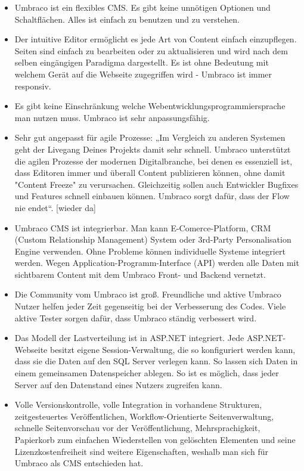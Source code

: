 \begin{itemize}	
	\item Umbraco ist ein flexibles CMS. Es gibt keine unnötigen Optionen und Schaltflächen. Alles ist einfach zu benutzen und zu verstehen.
	\item Der intuitive Editor ermöglicht es jede Art von Content einfach einzupflegen. Seiten sind einfach zu bearbeiten oder zu aktualisieren und wird  nach dem selben eingängigen Paradigma dargestellt. Es ist ohne Bedeutung mit welchem Gerät auf die Webseite zugegriffen wird - Umbraco ist immer responsiv. 
	\item Es gibt keine Einschränkung welche Webentwicklungsprogrammiersprache man nutzen muss. Umbraco ist sehr anpassungsfähig. 
	\item Sehr gut angepasst für agile Prozesse: „Im Vergleich zu anderen Systemen geht der Livegang Deines Projekts damit sehr schnell. Umbraco unterstützt die agilen Prozesse der modernen Digitalbranche, bei denen es essenziell ist, dass Editoren immer und überall Content publizieren können, ohne damit "Content Freeze" zu verursachen. Gleichzeitig sollen auch Entwickler Bugfixes und Features schnell einbauen können. Umbraco sorgt dafür, dass der Flow nie endet“. [wieder da] \cite{UmracoHQ2018}
	\item Umbraco CMS ist integrierbar. Man kann E-Comerce-Platform, CRM (Custom Relationship Management) System oder 3rd-Party Personalisation Engine verwenden. Ohne Probleme können individuelle Systeme integriert werden. Wegen Application-Programm-Interface (API) werden alle Daten mit sichtbarem Content mit dem Umbraco Front- und Backend vernetzt.
	\item Die Community vom Umbraco ist groß. Freundliche und aktive Umbraco Nutzer helfen jeder Zeit  gegenseitig bei der Verbesserung des Codes. Viele aktive Tester sorgen dafür, dass Umbraco ständig verbessert wird.
	\item Das Modell der Lastverteilung ist in ASP.NET integriert. Jede ASP.NET-Webseite besitzt eigene Session-Verwaltung, die so konfiguriert werden kann, dass sie die Daten auf den SQL Server verlegen kann. So lassen sich Daten in einem gemeinsamen Datenspeicher ablegen. So ist es möglich, dass jeder Server auf den Datenstand eines Nutzers zugreifen kann.
	\item Volle Versionskontrolle, volle Integration in vorhandene Strukturen, zeitgesteuertes Veröffentlichen, Workflow-Orientierte Seitenverwaltung, schnelle Seitenvorschau vor der Veröffentlichung, Mehrsprachigkeit, Papierkorb zum einfachen Wiederstellen von gelöschten Elementen und seine Lizenzkostenfreiheit sind weitere Eigenschaften, weshalb man sich für Umbraco als CMS entschieden hat.
\end{itemize}
	

